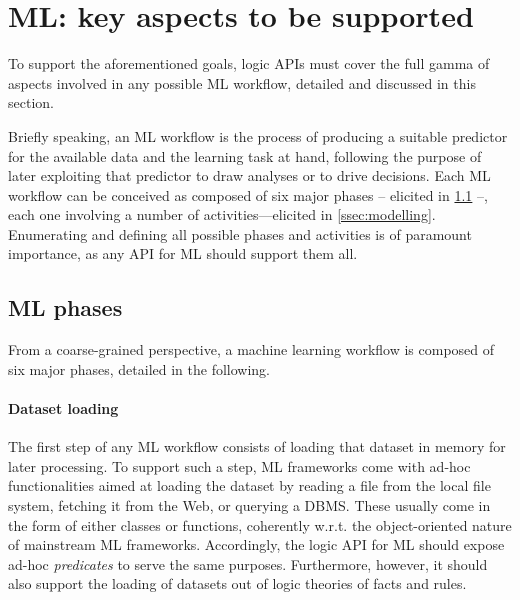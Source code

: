 \documentclass[runningheads]{llncs}
\begin{document}
\section{ML: key aspects to be supported}
\label{sec:requirements}

To support the aforementioned goals, logic APIs must cover the full gamma of aspects involved in any possible ML workflow, detailed and discussed in this section.

Briefly speaking, an ML workflow is the process of producing a suitable predictor for the available data and the learning task at hand, following the purpose of later exploiting that predictor to draw analyses or to drive decisions.
%
%
Each ML workflow can be conceived as composed of six major phases -- elicited in \cref{ssec:ml-phases} --, each one involving a number of activities---elicited in \cref{ssec:modelling}.
%
Enumerating and defining all possible phases and activities is of paramount importance, as any API for ML should support them all.

\subsection{ML phases}
\label{ssec:ml-phases}

From a coarse-grained perspective, a machine learning workflow is composed of six major phases, detailed in the following.

\paragraph{Dataset loading}
%
The first step of any ML workflow consists of loading that dataset in memory for later processing.
%
To support such a step, ML frameworks come with ad-hoc functionalities aimed at loading the dataset by reading a file from the local file system, fetching it from the Web, or querying a DBMS.
%
These usually come in the form of either classes or functions, coherently w.r.t. the object-oriented nature of mainstream ML frameworks.
%
Accordingly, the logic API for ML should expose ad-hoc \emph{predicates} to serve the same purposes.
%
Furthermore, however, it should also support the loading of datasets out of logic theories of facts and rules.
\end{document}
